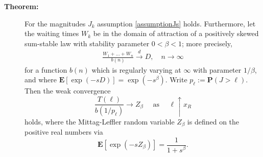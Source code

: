 \documentclass[]{elsarticle} %
\begin{document}
\begin{description}
\item[\textbf{Theorem:}]
For the magnitudes \(J_k\) assumption \eqref{assumptionJs} holds.
Furthermore, let the waiting times \(W_k\) be in the domain of
attraction of a positively skewed sum-stable law with stability
parameter \(0 < \beta < 1\); more precisely,
\begin{align} \label{eq:stability}
\frac{W_1 + \ldots + W_n}{b(n)} \overset{d}{\longrightarrow} D, 
\quad n \to \infty
\end{align} for a function \(b(n)\) which is regularly varying at
\(\infty\) with parameter \(1/\beta\), and where
\(\mathbf E[\exp(-sD)] = \exp(-s^\beta)\). Write
\(p_{\ell} := \mathbf P(J > \ell)\). Then the weak convergence \[
\frac{T(\ell)} {b(1/p_{\ell})} \to Z_\beta \quad \text{ as } \quad \ell \uparrow x_R
\] holds, where the Mittag-Leffler random variable \(Z_\beta\) is
defined on the positive real numbers via \[
\mathbf E[\exp(-sZ_\beta)] = \frac{1}{1+s^\beta}.
\]
\end{description}
\end{document}
